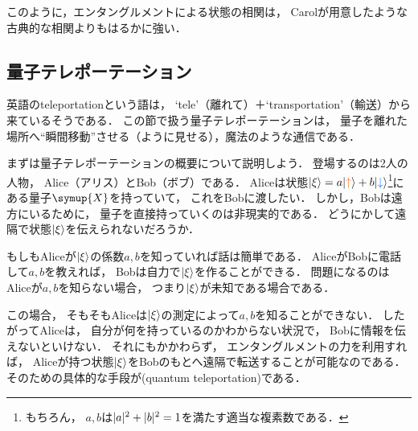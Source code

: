 \documentclass[
]{sotsu}
\newcommand{\bitone}{\mathcolor{fire}{\uparrow}}
\newcommand{\bittwo}{\mathcolor{water}{\downarrow}}
\begin{document}
このように，エンタングルメントによる状態の相関は，
Carolが用意したような古典的な相関よりもはるかに強い．



\subsection{量子テレポーテーション}
\label{sec:quantum-teleportation}

英語のteleportationという語は，
`tele'（離れて）＋`transportation'（輸送）から来ているそうである．
この節で扱う量子テレポーテーションは，
量子を離れた場所へ``瞬間移動''させる（ように見せる），魔法のような通信である．

まずは量子テレポーテーションの概要について説明しよう．
登場するのは2人の人物，
Alice（アリス）とBob（ボブ）である．
Aliceは状態$\ket{\xi} = a \ket{\bitone} + b \ket{\bittwo}$\footnote{
    もちろん，
    $a, b$は$\lvert a\rvert^2 + \lvert b\rvert^2 = 1$を満たす適当な複素数である．
}にある量子$\symup{X}$を持っていて，
これをBobに渡したい．
しかし，Bobは遠方にいるために，
量子を直接持っていくのは非現実的である．
どうにかして遠隔で状態$\ket{\xi}$を伝えられないだろうか．

もしもAliceが$\ket{\xi}$の係数$a, b$を知っていれば話は簡単である．
AliceがBobに電話して$a, b$を教えれば，
Bobは自力で$\ket{\xi}$を作ることができる．
問題になるのはAliceが$a, b$を知らない場合，
つまり$\ket{\xi}$が未知である場合である．

この場合，
そもそもAliceは$\ket{\xi}$の測定によって$a, b$を知ることができない．
したがってAliceは，
自分が何を持っているのかわからない状況で，
Bobに情報を伝えないといけない．
それにもかかわらず，
エンタングルメントの力を利用すれば，
Aliceが持つ状態$\ket{\xi}$をBobのもとへ遠隔で転送することが可能なのである．
そのための具体的な手段が(quantum teleportation)である．
\end{document}
